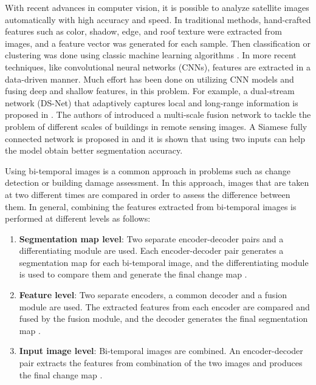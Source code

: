 \documentclass{article}
\begin{document}
With recent advances in computer vision, it is possible to analyze satellite images automatically with high accuracy and speed. In traditional methods, hand-crafted features such as color, shadow, edge, and roof texture were extracted from images, and a feature vector was generated for each sample. Then classification or clustering was done using classic machine learning algorithms \cite{sirmacek2008building, ferraioli2009multichannel, awrangjeb2011improved, gong2013fuzzy}. In more recent techniques, like convolutional neural networks (CNNs), features are extracted in a data-driven manner. Much effort has been done on utilizing CNN models and fusing deep and shallow features, in this problem. For example, a dual-stream network (DS-Net) that adaptively captures local and long-range information is proposed in \cite{zhang2020local}. The authors of \cite{liu2020multiscale} introduced a multi-scale fusion network to tackle the problem of different scales of buildings in remote sensing images. A Siamese fully connected network is proposed in \cite{ji2018fully} and it is shown that using two inputs can help the model obtain better segmentation accuracy. 

Using bi-temporal images is a common approach in problems such as change detection or building damage assessment. In this approach, images that are taken at two different times are compared in order to assess the difference between them. In general, combining the features extracted from bi-temporal images is performed at different levels as follows: 
\begin{enumerate}
	\item 
	\textbf{Segmentation map level}: Two separate encoder-decoder pairs and a differentiating  module are used. Each encoder-decoder pair generates a segmentation map for each bi-temporal image, and the differentiating module is used to compare them and generate the final change map \cite{ji2019building, liu2019temporal}.
	\item 
	\textbf{Feature level}: Two separate encoders, a common decoder and a fusion module are used. The extracted features from each encoder are compared and fused by the fusion module, and the decoder generates the final segmentation map \cite{chen2020spatial,peng2020optical}.
	\item 
	\textbf{Input image level}: Bi-temporal images are combined. An encoder-decoder pair extracts the features from combination of the two images and produces the final change map \cite{de2020change,zhao2020using}. 
\end{enumerate} 
\end{document}

